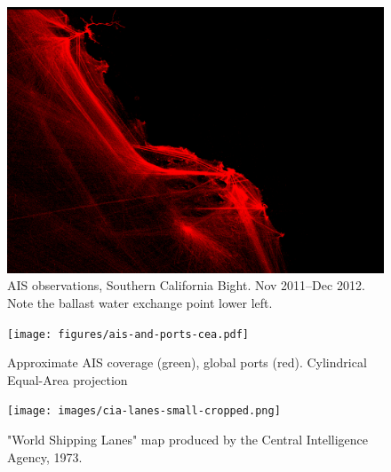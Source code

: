 \begin{figure}[htbp]
  \centering
  \includegraphics[width=140mm]{figures/cargo_density.png}
  \caption{AIS observations, Southern California Bight. Nov 2011--Dec 2012. Note the ballast water exchange point lower left.}
  \label{fig:cal-cargo}
\end{figure}

\begin{figure}[htbp]
  \centering
  \texttt{[image: figures/ais-and-ports-cea.pdf]}
  \caption{Approximate AIS coverage (green), global ports (red). Cylindrical Equal-Area projection}
  \label{fig:ais-coverage}
\end{figure}

\begin{figure}[htbp]
  \centering
  \texttt{[image: images/cia-lanes-small-cropped.png]}
  \caption{"World Shipping Lanes" map produced by the Central Intelligence Agency, 1973.}
  \label{fig:cia-shipping-map}
\end{figure}



